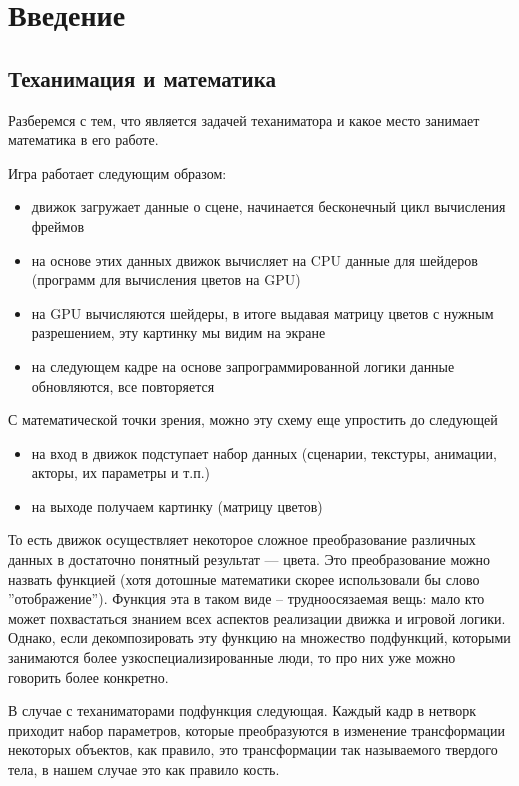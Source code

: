 \documentclass[a4paper,12pt]{article}
\newcounter{z-counter}
\begin{document}
\tableofcontents  %

\section*{Введение}

\subsection*{Теханимация и математика}
Разберемся с тем, что является задачей теханиматора и какое место занимает математика в его работе.

Игра работает следующим образом:
\begin{itemize}
    \item движок загружает данные о сцене, начинается бесконечный цикл вычисления фреймов
    \item на основе этих данных движок вычисляет на CPU данные для шейдеров (программ для вычисления цветов на GPU)
    \item на GPU вычисляются шейдеры, в итоге выдавая матрицу цветов с нужным разрешением, эту картинку мы видим на экране
    \item на следующем кадре на основе запрограммированной логики данные обновляются, все повторяется
\end{itemize}

С математической точки зрения, можно эту схему еще упростить до следующей
\begin{itemize}
    \item на вход в движок подступает набор данных (сценарии, текстуры, анимации, акторы, их параметры и т.п.)
    \item на выходе получаем картинку (матрицу цветов)
\end{itemize}
То есть движок осуществляет некоторое сложное преобразование различных данных в достаточно понятный результат --- цвета. Это преобразование можно назвать функцией (хотя дотошные математики скорее использовали бы слово ''отображение''). Функция эта в таком виде -- трудноосязаемая вещь: мало кто может похвастаться знанием всех аспектов реализации движка и игровой логики. Однако, если декомпозировать эту функцию на множество подфункций, которыми занимаются более узкоспециализированные люди, то про них уже можно говорить более конкретно.

В случае с теханиматорами подфункция следующая. Каждый кадр в нетворк приходит набор параметров, которые преобразуются в изменение трансформации некоторых объектов, как правило, это трансформации так называемого твердого тела, в нашем случае это как правило кость.
\end{document}
